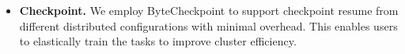 \begin{itemize}
\item \textbf{Checkpoint.} We employ ByteCheckpoint \cite{wan2025bytecheckpointunifiedcheckpointinglarge} to support checkpoint resume from different distributed configurations with minimal overhead. This enables users to elastically train the tasks to improve cluster efficiency.
\end{itemize}



